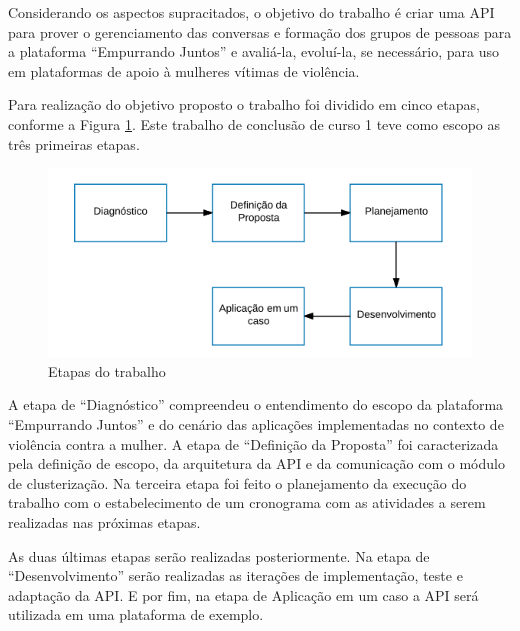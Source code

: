 Considerando os aspectos supracitados, o objetivo do trabalho é criar uma API para prover o gerenciamento das conversas e formação
dos grupos de pessoas para a plataforma ``Empurrando Juntos'' e avaliá-la, evoluí-la, se necessário, para uso 
em plataformas de apoio à mulheres vítimas de violência.



Para realização do objetivo proposto o trabalho foi dividido em cinco etapas, conforme a Figura \ref{fig:etapas_trabalho}. Este trabalho de conclusão de curso 1 
teve como escopo as três primeiras etapas.

\begin{figure}[h!]
\centering
\includegraphics[scale=0.6]{figuras/etapas.png}
\caption{Etapas do trabalho}
\label{fig:etapas_trabalho}
\end{figure}

A etapa de ``Diagnóstico'' compreendeu o entendimento do escopo da plataforma ``Empurrando Juntos'' e do cenário das 
aplicações implementadas no contexto de violência contra a mulher. A etapa de ``Definição da Proposta'' foi caracterizada pela definição de escopo, 
da arquitetura da API e da comunicação com o módulo de clusterização. Na terceira etapa foi feito o planejamento da execução do trabalho com o estabelecimento
de um cronograma com as atividades a serem realizadas nas próximas etapas. 

As duas últimas etapas serão realizadas posteriormente. Na etapa de ``Desenvolvimento''
serão realizadas as iterações de implementação, teste e adaptação da API. E por fim, na etapa de Aplicação em um caso a API será utilizada em uma 
plataforma de exemplo.


